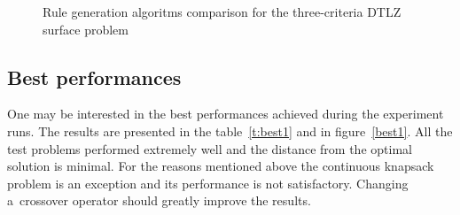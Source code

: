 \begin{figure}
  \centering
  \caption{Rule generation algoritms comparison for the three-criteria DTLZ surface problem}
  \label{c3_surface_algo}
\end{figure}


\clearpage{}

\subsection{Best performances}
One may be interested in the best performances achieved during the experiment
runs. The results are presented in the table~\ref{t:best1} and in
figure~\ref{best1}. All the test problems performed extremely well and the
distance from the optimal solution is minimal. For the reasons mentioned above
the continuous knapsack problem is an exception and its performance is not
satisfactory. Changing a~crossover operator should greatly improve the
results.

